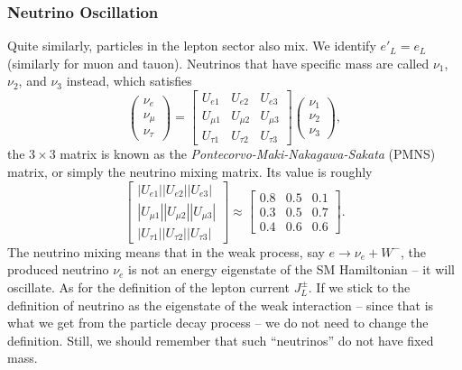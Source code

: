 \documentclass[aps,rmp,twocolumn,superscriptaddress,nofootinbib]{revtex4-2}
\begin{document}
\subsubsection{Neutrino Oscillation}
Quite similarly, particles in the lepton sector also mix.
We identify $e'_L = e_L$ (similarly for muon and tauon).
Neutrinos that have specific mass are called $\nu_1$, $\nu_2$, and $\nu_3$ instead, which satisfies
\begin{equation}
	\begin{pmatrix}
		\nu_{e} \\ \nu_{\mu} \\ \nu_{\tau}
	\end{pmatrix} = 
	\begin{bmatrix}
		U_{e 1} & U_{e 2} & U_{e 3} \\
		U_{\mu 1} & U_{\mu 2} & U_{\mu 3} \\
		U_{\tau 1} & U_{\tau 2} & U_{\tau 3}
	\end{bmatrix}
	\begin{pmatrix}
		\nu_{1} \\ \nu_{2} \\ \nu_{3}
	\end{pmatrix},
\end{equation}
the $3 \times 3$ matrix is known as the \textit{Pontecorvo-Maki-Nakagawa-Sakata} (PMNS) matrix, or simply the neutrino mixing matrix.
Its value is roughly
\begin{equation}
	\begin{bmatrix}
		\left|U_{e 1}\right|\left|U_{e 2}\right|\left|U_{e 3}\right| \\
		\left|U_{\mu 1}\right|\left|U_{\mu 2}\right|\left|U_{\mu 3}\right| \\
		\left|U_{\tau 1}\right|\left|U_{\tau 2}\right|\left|U_{\tau 3}\right|
	\end{bmatrix} \approx
	\begin{bmatrix}
		0.8 & 0.5 & 0.1 \\
		0.3 & 0.5 & 0.7 \\
		0.4 & 0.6 & 0.6
	\end{bmatrix}.
\end{equation}
The neutrino mixing means that in the weak process, say $e \rightarrow \nu_e + W^-$, the produced neutrino $\nu_e$ is not an energy eigenstate of the SM Hamiltonian -- it will oscillate.
As for the definition of the lepton current $J^\pm_L$. 
If we stick to the definition of neutrino as the eigenstate of the weak interaction -- since that is what we get from the particle decay process -- we do not need to change the definition. 
Still, we should remember that such ``neutrinos'' do not have fixed mass.
\end{document}
